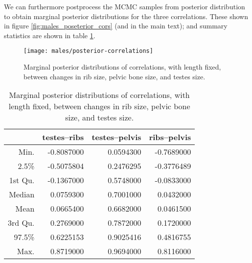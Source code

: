 \documentclass{article}
\begin{document}
We can furthermore postprocess the MCMC samples from posterior distribution
to obtain marginal posterior distributions for the three correlations.
These shown in figure \ref{fig:males_poseterior_cors} (and in the main text);
and summary statistics are shown in table \ref{tab:posterior_cors}.

\begin{figure}[ht]
  \begin{center}
    \texttt{[image: males/posterior-correlations]}
  \end{center}
  \caption{Marginal posterior distributions of correlations, with length fixed,
  between changes in rib size, pelvic bone size, and testes size.
  \label{fig:males_posterior_cors}
  }
\end{figure}



\begin{table}[ht]
\centering
\begin{tabular}{rrrr}
  \hline
        &  testes--ribs & testes--pelvis & ribs--pelvis \\
  \hline
 Min. &     -0.8087000  &   0.0594300 & -0.7689000   \\
 2.5\% &    -0.5075804  &   0.2476295 & -0.3776489   \\
 1st Qu. &  -0.1367000  &   0.5748000 & -0.0833000   \\
 Median &    0.0759300  &   0.7001000 &  0.0432000   \\
 Mean &      0.0665400  &   0.6682000 &  0.0461500   \\
 3rd Qu. &   0.2769000  &   0.7872000 &  0.1720000   \\
 97.5\%  &   0.6225153  &   0.9025416 &  0.4816755   \\
 Max. &      0.8719000  &   0.9694000 &  0.8116000   \\
   \hline
\end{tabular}
  \caption{Marginal posterior distributions of correlations, with length fixed,
  between changes in rib size, pelvic bone size, and testes size.
  \label{tab:posterior_cors}
}
\end{table}
\end{document}
